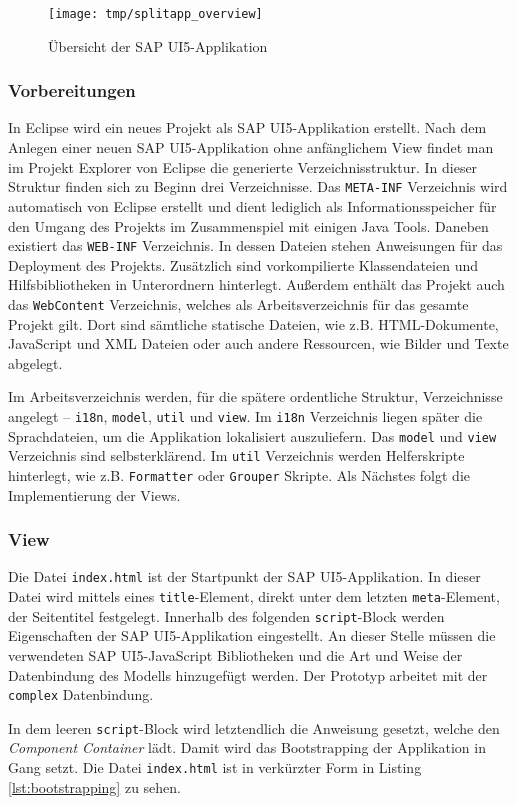 \vspace{1em}
\begin{figure}[htb]
  \centering
  \texttt{[image: tmp/splitapp\_overview]}
  \caption[Übersicht der SAP UI5-Applikation]{Übersicht der SAP UI5-Applikation \cite{SAPSplitApp}}
  \label{fig:splitappoverview}
\end{figure}

\subsubsection{Vorbereitungen}
In Eclipse wird ein neues Projekt als SAP UI5-Applikation erstellt. Nach dem Anlegen einer neuen SAP UI5-Applikation ohne anfänglichem View findet man im Projekt Explorer von Eclipse die generierte Verzeichnisstruktur. In dieser Struktur finden sich zu Beginn drei Verzeichnisse. Das \texttt{META-INF} Verzeichnis wird automatisch von Eclipse erstellt und dient lediglich als Informationsspeicher für den Umgang des Projekts im Zusammenspiel mit einigen Java Tools. Daneben existiert das \texttt{WEB-INF} Verzeichnis. In dessen Dateien stehen Anweisungen für das Deployment des Projekts. Zusätzlich sind vorkompilierte Klassendateien und Hilfsbibliotheken in Unterordnern hinterlegt. Außerdem enthält das Projekt auch das \texttt{WebContent} Verzeichnis, welches als Arbeitsverzeichnis für das gesamte Projekt gilt. Dort sind sämtliche statische Dateien, wie z.B. HTML-Dokumente, JavaScript und XML Dateien oder auch andere Ressourcen, wie Bilder und Texte abgelegt.\par Im Arbeitsverzeichnis werden, für die spätere ordentliche Struktur, Verzeichnisse angelegt -- \texttt{i18n}, \texttt{model}, \texttt{util} und \texttt{view}. Im \texttt{i18n} Verzeichnis liegen später die Sprachdateien, um die Applikation lokalisiert auszuliefern. Das \texttt{model} und \texttt{view} Verzeichnis sind selbsterklärend. Im \texttt{util} Verzeichnis werden Helferskripte hinterlegt, wie z.B. \texttt{Formatter} oder \texttt{Grouper} Skripte. Als Nächstes folgt die Implementierung der Views.

\subsubsection{View}
Die Datei \texttt{index.html} ist der Startpunkt der SAP UI5-Applikation. In dieser Datei wird mittels eines \texttt{title}-Element, direkt unter dem letzten \texttt{meta}-Element, der Seitentitel festgelegt. Innerhalb des folgenden \texttt{script}-Block werden Eigenschaften der SAP UI5-Applikation eingestellt. An dieser Stelle müssen die verwendeten SAP UI5-JavaScript Bibliotheken und die Art und Weise der Datenbindung des Modells hinzugefügt werden. Der Prototyp arbeitet mit der \texttt{complex} Datenbindung.\par In dem leeren \texttt{script}-Block wird letztendlich die Anweisung gesetzt, welche den \textit{Component Container} lädt. Damit wird das Bootstrapping der Applikation in Gang setzt. Die Datei \texttt{index.html} ist in verkürzter Form in Listing \ref{lst:bootstrapping} zu sehen.
	
